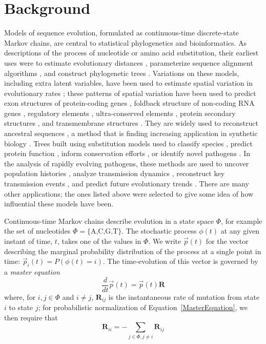\documentclass{bmcart}
\newcommand{\matr}[1]{\mathbf{#1}}
\newcommand{\eqref}[1]{Equation~\ref{#1}}
\newcommand{\statespace}{\Phi}
\newcommand{\state}{\phi}
\newcommand{\statevec}{\vec{p}}
\newcommand{\ratematrix}{\matr{R}}
\begin{document}
\section*{Background}

Models of sequence evolution, formulated as continuous-time discrete-state Markov chains,
are central to statistical phylogenetics and bioinformatics.
As descriptions of the process of nucleotide or amino acid substitution,
their earliest uses were to estimate evolutionary distances \cite{JukesCantor69},
parameterize sequence alignment algorithms \cite{DayhoffEtal72},
and construct phylogenetic trees \cite{Felsenstein81}.
Variations on these models, including extra latent variables,
have been used to estimate spatial variation in evolutionary rates \cite{Yang93,Yang94};
these patterns of spatial variation have been used to
predict exon structures of protein-coding genes \cite{PedersenHein2003,SiepelHaussler04b},
foldback structure of non-coding RNA genes \cite{PedersenEtAl2006,PollardEtAl2006},
regulatory elements \cite{PedersenEtAl04},
ultra-conserved elements \cite{SiepelEtAl2005},
protein secondary structures \cite{GoldmanEtAl96},
and transmembrane structures \cite{LioGoldman99}.
They are widely used to reconstruct ancestral sequences \cite{BlanchetteEtAl2004,UgaldeEtAl2004,Liberles2007,OrtlundEtAl2007,GaucherEtAl2008,AshkenazyEtAl2012,AlcolombriEtAl2011,SantiagoOrtizEtAl2015,ZakasEtAl2016},
a method that is finding increasing application in synthetic biology \cite{Liberles2007,AlcolombriEtAl2011,SantiagoOrtizEtAl2015,ZakasEtAl2016}.
Trees built using substitution models used to classify species \cite{pmid26385966},
predict protein function \cite{EngelhardtEtAl2005},
inform conservation efforts \cite{pmid25561668},
or identify novel pathogens \cite{pmid12690091}.
In the analysis of rapidly evolving pathogens, these methods are used to
uncover population histories \cite{pmid15703244},
analyze transmission dynamics \cite{pmid22927414},
reconstruct key transmission events \cite{pmid27783600},
and predict future evolutionary trends \cite{pmid27774306}.
There are many other applications;
the ones listed above were selected to give some idea of how influential these models have been.

Continuous-time Markov chains describe evolution in a state space $\statespace$,
for example the set of nucleotides $\statespace = \{ \mbox{A,C,G,T} \}$.
The stochastic process $\state(t)$ at any given instant of time, $t$,
takes one of the values in $\statespace$.
We write $\statevec(t)$ for the vector describing the marginal probability distribution of the process
at a single point in time:
$\statevec_i(t) = P(\state(t) = i)$.
The time-evolution of this vector is governed by a {\em master equation}
\begin{equation}
\frac{d}{dt} \statevec(t) = \statevec(t) \ratematrix
\label{MasterEquation}
\end{equation}
where, for $i,j \in \statespace$ and $i \neq j$,
$\ratematrix_{ij}$ is the instantaneous rate of mutation from state $i$ to state $j$;
for probabilistic normalization of \eqref{MasterEquation},
we then require that
\[
\ratematrix_{ii} = -\sum_{j \in \statespace, j \neq i} \ratematrix_{ij}
\]
\end{document}
